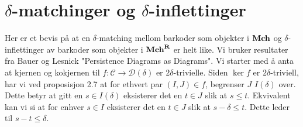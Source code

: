 \documentclass{article}
\newcommand{\C}{\mathcal{C}}
\newcommand{\D}{\mathcal{D}}
\newcommand{\Mch}{\textnormal{\textbf{Mch}}}
\newcommand{\MchR}{\textnormal{\textbf{Mch}}^\textnormal{\textbf{R}}}
\begin{document}
\section{$\delta$-matchinger og $\delta$-inflettinger}
Her er et bevis på at en $\delta$-matching mellom barkoder som objekter i $\Mch$ og
$\delta$-inflettinger av barkoder som objekter i $\MchR$ er helt like. Vi bruker
  resultater fra Bauer og Lesnick "Persistence Diagrams as Diagrams". Vi starter med
  å anta at kjernen og kokjernen til $f:\C\to\D(\delta)$ er $2\delta$-trivielle. Siden $\ker f$ er
  $2\delta$-triviell, har vi ved proposisjon 2.7 at for ethvert par $(I,J)\in f$,
  begrenser $J$ $I(\delta)$ over. Dette betyr at gitt en $s\in I(\delta)$ eksisterer det
  en $t\in J$ slik at $s\leq t$. Ekvivalent kan vi si at for enhver $s\in I$ eksisterer
  det en $t\in J$ slik at $s-\delta\leq t$. Dette leder til $s-t\leq \delta$.
\end{document}
